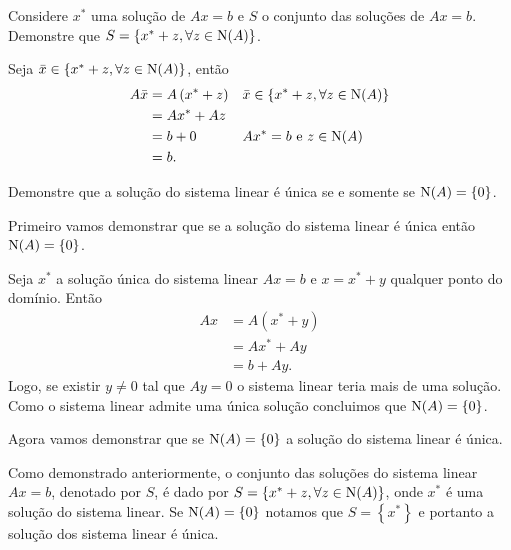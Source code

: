 \begin{questions}
    \question Considere $x^*$ uma solu\c{c}\~{a}o de $A x = b$ e $S$ o conjunto das solu\c{c}\~{o}es de $A x = b$. Demonstre que $S = \left\{ x^* + z, \forall z \in \text{N} (A) \right\}$.
    \begin{solution}
        Seja $\bar{x} \in \left\{ x^* + z, \forall z \in \text{N} (A) \right\}$, ent\~{a}o
        \begin{align*}
            A \bar{x} &= A \left( x^* + z \right) && \bar{x} \in \left\{ x^* + z, \forall z \in \text{N} (A) \right\} \\
            &= A x^* + A z \\
            &= b + 0 && A x^* = b \text{ e } z \in \text{N} (A) \\
            &= b.
        \end{align*}
    \end{solution}

    \question Demonstre que a solu\c{c}\~{a}o do sistema linear \'{e} \'{u}nica se e somente se $\text{N} (A) = \left\{ 0 \right\}$.
    \begin{solution}
        Primeiro vamos demonstrar que se a solu\c{c}\~{a}o do sistema linear \'{e} \'{u}nica ent\~{a}o $\text{N} (A) = \left\{ 0 \right\}$.

        Seja $x^*$ a solu\c{c}\~{a}o \'{u}nica do sistema linear $A x = b$ e $x = x^* + y$ qualquer ponto do dom\'{i}nio. Ent\~{a}o
        \begin{align*}
            A x &= A \left( x^* + y \right) \\
            &= A x^* + A y \\
            &= b + A y.
        \end{align*}
        Logo, se existir $y \neq 0$ tal que $A y = 0$ o sistema linear teria mais de uma solu\c{c}\~{a}o. Como o sistema linear admite uma \'{u}nica solu\c{c}\~{a}o concluimos que $\text{N} (A) = \left\{ 0 \right\}$.

        Agora vamos demonstrar que se $\text{N} (A) = \left\{ 0 \right\}$ a solu\c{c}\~{a}o do sistema linear \'{e} \'{u}nica.

        Como demonstrado anteriormente, o conjunto das solu\c{c}\~{o}es do sistema linear $A x = b$, denotado por $S$, \'{e} dado por $S = \left\{ x^* + z, \forall z \in \text{N} (A) \right\}$, onde $x^*$ \'{e} uma solu\c{c}\~{a}o do sistema linear. Se $\text{N} (A) = \left\{ 0 \right\}$ notamos que $S = \left\{ x^* \right\}$ e portanto a solu\c{c}\~{a}o dos sistema linear \'{e} \'{u}nica.
    \end{solution}


\end{questions}
